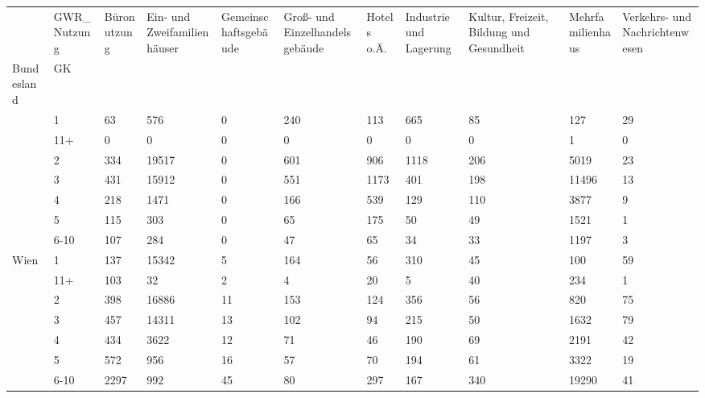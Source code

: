 \documentclass[
  ngerman,
  a4paper,
  DIV=11]{scrreprt}
\newcounter{none} %
\begin{document}
{\def\LTcaptype{none} %
\begin{longtable}[]{@{}lllllllllll@{}}
\toprule\noalign{}
& GWR\_Nutzung & Büronutzung & Ein- und Zweifamilienhäuser &
Gemeinschaftsgebäude & Groß- und Einzelhandelsgebäude & Hotels o.Ä. &
Industrie und Lagerung & Kultur, Freizeit, Bildung und Gesundheit &
Mehrfamilienhaus & Verkehrs- und Nachrichtenwesen \\
Bundesland & GK & & & & & & & & & \\
\midrule\noalign{}
\endhead
\bottomrule\noalign{}
\endlastfoot
\multirow{7}{*}{Salzburg} & 1 & 63 & 576 & 0 & 240 & 113 & 665 & 85 &
127 & 29 \\
& 11+ & 0 & 0 & 0 & 0 & 0 & 0 & 0 & 1 & 0 \\
& 2 & 334 & 19517 & 0 & 601 & 906 & 1118 & 206 & 5019 & 23 \\
& 3 & 431 & 15912 & 0 & 551 & 1173 & 401 & 198 & 11496 & 13 \\
& 4 & 218 & 1471 & 0 & 166 & 539 & 129 & 110 & 3877 & 9 \\
& 5 & 115 & 303 & 0 & 65 & 175 & 50 & 49 & 1521 & 1 \\
& 6-10 & 107 & 284 & 0 & 47 & 65 & 34 & 33 & 1197 & 3 \\
\multirow{7}{*}{Wien} & 1 & 137 & 15342 & 5 & 164 & 56 & 310 & 45 & 100
& 59 \\
& 11+ & 103 & 32 & 2 & 4 & 20 & 5 & 40 & 234 & 1 \\
& 2 & 398 & 16886 & 11 & 153 & 124 & 356 & 56 & 820 & 75 \\
& 3 & 457 & 14311 & 13 & 102 & 94 & 215 & 50 & 1632 & 79 \\
& 4 & 434 & 3622 & 12 & 71 & 46 & 190 & 69 & 2191 & 42 \\
& 5 & 572 & 956 & 16 & 57 & 70 & 194 & 61 & 3322 & 19 \\
& 6-10 & 2297 & 992 & 45 & 80 & 297 & 167 & 340 & 19290 & 41 \\
\end{longtable}
}
\end{document}
